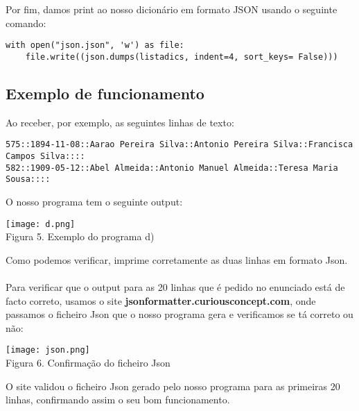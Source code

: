 \documentclass[11pt,a4paper]{report}%
\begin{document}
Por fim, damos print ao nosso dicionário em formato JSON usando o seguinte comando:

\begin{verbatim}
with open("json.json", 'w') as file:
    file.write((json.dumps(listadics, indent=4, sort_keys= False)))
\end{verbatim}


\subsection{Exemplo de funcionamento}
Ao receber, por exemplo, as seguintes linhas de texto:

\begin{verbatim}
575::1894-11-08::Aarao Pereira Silva::Antonio Pereira Silva::Francisca Campos Silva::::
582::1909-05-12::Abel Almeida::Antonio Manuel Almeida::Teresa Maria Sousa::::
\end{verbatim}

O nosso programa tem o seguinte output:
\begin{center}
    \texttt{[image: d.png]}
    \\
    \caption{Figura 5. Exemplo do programa d) }
\end{center}

Como podemos verificar, imprime corretamente as duas linhas em formato Json.\\
\\
Para verificar que o output para as 20 linhas que é pedido no enunciado está de facto correto, usamos o site \textbf{jsonformatter.curiousconcept.com}, onde passamos o ficheiro Json que o nosso programa gera e verificamos se tá correto ou não:

\begin{center}
    \texttt{[image: json.png]}
    \\
    \caption{Figura 6. Confirmação do ficheiro Json }
\end{center}

O site validou o ficheiro Json gerado pelo nosso programa para as primeiras 20 linhas, confirmando assim o seu bom funcionamento.

\end{document}
